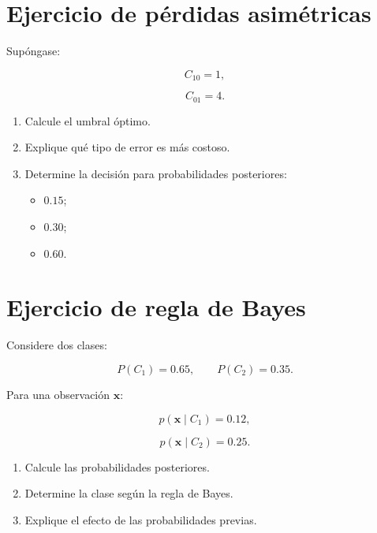 \documentclass[
  spanish,
  10.5pt,
  letterpaper,
  DIV=11,
  numbers=noendperiod,
  oneside,
  open=any]{scrreprt}
\providecommand{\tightlist}{%
  \setlength{\itemsep}{0pt}\setlength{\parskip}{0pt}}
\theoremstyle{definition}
\theoremstyle{definition}
\theoremstyle{plain}
\theoremstyle{remark}
\begin{document}
\section*{Ejercicio de pérdidas
asimétricas}\label{ejercicio-de-puxe9rdidas-asimuxe9tricas}


Supóngase:

\[
C_{10}=1,
\]

\[
C_{01}=4.
\]

\begin{enumerate}
\def\labelenumi{\arabic{enumi}.}
\tightlist
\item
  Calcule el umbral óptimo.
\item
  Explique qué tipo de error es más costoso.
\item
  Determine la decisión para probabilidades posteriores:

  \begin{itemize}
  \tightlist
  \item
    \(0.15\);
  \item
    \(0.30\);
  \item
    \(0.60\).
  \end{itemize}
\end{enumerate}

\section*{Ejercicio de regla de
Bayes}\label{ejercicio-de-regla-de-bayes}


Considere dos clases:

\[
P(C_1)=0.65,
\qquad
P(C_2)=0.35.
\]

Para una observación \(\mathbf{x}\):

\[
p(\mathbf{x}\mid C_1)=0.12,
\]

\[
p(\mathbf{x}\mid C_2)=0.25.
\]

\begin{enumerate}
\def\labelenumi{\arabic{enumi}.}
\tightlist
\item
  Calcule las probabilidades posteriores.
\item
  Determine la clase según la regla de Bayes.
\item
  Explique el efecto de las probabilidades previas.
\end{enumerate}
\end{document}
